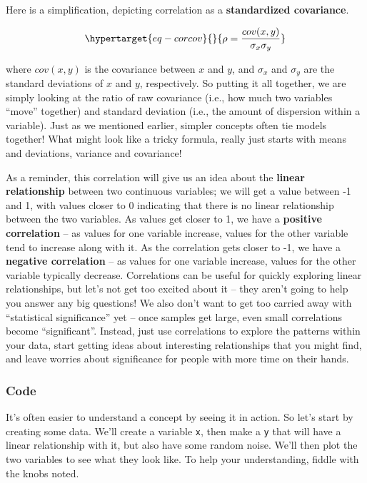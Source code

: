 \documentclass[
  letterpaper,
]{krantz}
\begin{document}
Here is a simplification, depicting correlation as a
\textbf{standardized covariance}.

\begin{equation}\protect\hypertarget{eq-corcov}{}{
\rho = \frac{cov(x,y)}{\sigma_x\sigma_y}
}\label{eq-corcov}\end{equation}

where \(cov(x,y)\) is the covariance between \(x\) and \(y\), and
\(\sigma_x\) and \(\sigma_y\) are the standard deviations of \(x\) and
\(y\), respectively. So putting it all together, we are simply looking
at the ratio of raw covariance (i.e., how much two variables ``move''
together) and standard deviation (i.e., the amount of dispersion within
a variable). Just as we mentioned earlier, simpler concepts often tie
models together! What might look like a tricky formula, really just
starts with means and deviations, variance and covariance!

As a reminder, this correlation will give us an idea about the
\textbf{linear relationship} between two continuous variables; we will
get a value between -1 and 1, with values closer to 0 indicating that
there is no linear relationship between the two variables. As values get
closer to 1, we have a \textbf{positive correlation} -- as values for
one variable increase, values for the other variable tend to increase
along with it. As the correlation gets closer to -1, we have a
\textbf{negative correlation} -- as values for one variable increase,
values for the other variable typically decrease. Correlations can be
useful for quickly exploring linear relationships, but let's not get too
excited about it -- they aren't going to help you answer any big
questions! We also don't want to get too carried away with ``statistical
significance'' yet -- once samples get large, even small correlations
become ``significant''. Instead, just use correlations to explore the
patterns within your data, start getting ideas about interesting
relationships that you might find, and leave worries about significance
for people with more time on their hands.

\subsubsection{Code}\label{code}

It's often easier to understand a concept by seeing it in action. So
let's start by creating some data. We'll create a variable \texttt{x},
then make a \texttt{y} that will have a linear relationship with it, but
also have some random noise. We'll then plot the two variables to see
what they look like. To help your understanding, fiddle with the knobs
noted.
\end{document}
